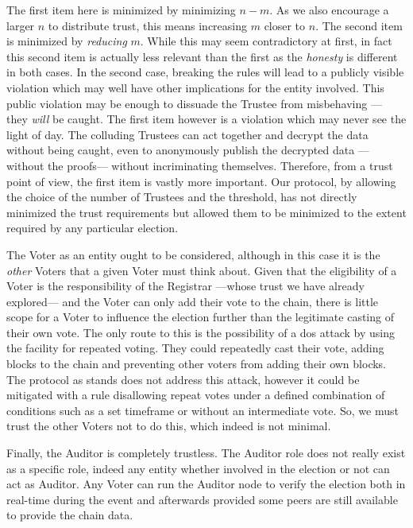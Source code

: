 The first item here is minimized by minimizing $n - m$. As we also encourage a larger $n$ to distribute trust, this means increasing $m$ closer to $n$. The second item is minimized by \emph{reducing} $m$. While this may seem contradictory at first, in fact this second item is actually less relevant than the first as the \emph{honesty} is different in both cases. In the second case, breaking the rules will lead to a publicly visible violation which may well have other implications for the entity involved. This public violation may be enough to dissuade the Trustee from misbehaving --- they \emph{will} be caught. The first item however is a violation which may never see the light of day. The colluding Trustees can act together and decrypt the data without being caught, even to anonymously publish the decrypted data ---without the proofs--- without incriminating themselves. Therefore, from a trust point of view, the first item is vastly more important. Our protocol, by allowing the choice of the number of Trustees and the threshold, has not directly minimized the trust requirements but allowed them to be minimized to the extent required by any particular election.

The Voter as an entity ought to be considered, although in this case it is the \emph{other} Voters that a given Voter must think about. Given that the eligibility of a Voter is the responsibility of the Registrar ---whose trust we have already explored--- and the Voter can only add their vote to the chain, there is little scope for a Voter to influence the election further than the legitimate casting of their own vote. The only route to this is the possibility of a \gls{dos} attack by using the facility for repeated voting. They could repeatedly cast their vote, adding blocks to the chain and preventing other voters from adding their own blocks. The protocol as stands does not address this attack, however it could be mitigated with a rule disallowing repeat votes under a defined combination of conditions such as a set timeframe or without an intermediate vote. So, we must trust the other Voters not to do this, which indeed is not minimal.

Finally, the Auditor is completely trustless. The Auditor role does not really exist as a specific role, indeed any entity whether involved in the election or not can act as Auditor. Any Voter can run the Auditor node to verify the election both in real-time during the event and afterwards provided some peers are still available to provide the chain data.


